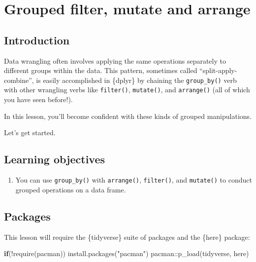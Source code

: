 \documentclass[
  letterpaper,
  DIV=11,
  numbers=noendperiod]{scrreprt}
\newenvironment{Shaded}{\begin{snugshade}}{\end{snugshade}}
\newcommand{\ControlFlowTok}[1]{\textcolor[rgb]{0.00,0.23,0.31}{\textbf{#1}}}
\newcommand{\FunctionTok}[1]{\textcolor[rgb]{0.28,0.35,0.67}{#1}}
\newcommand{\NormalTok}[1]{\textcolor[rgb]{0.00,0.23,0.31}{#1}}
\newcommand{\SpecialCharTok}[1]{\textcolor[rgb]{0.37,0.37,0.37}{#1}}
\newcommand{\StringTok}[1]{\textcolor[rgb]{0.13,0.47,0.30}{#1}}
\providecommand{\tightlist}{%
  \setlength{\itemsep}{0pt}\setlength{\parskip}{0pt}}\usepackage{longtable,booktabs,array}
\begin{document}
\chapter{Grouped filter, mutate and
arrange}\label{grouped-filter-mutate-and-arrange}

\section{Introduction}\label{introduction-11}

Data wrangling often involves applying the same operations separately to
different groups within the data. This pattern, sometimes called
``split-apply-combine'', is easily accomplished in \{dplyr\} by chaining
the \texttt{group\_by()} verb with other wrangling verbs like
\texttt{filter()}, \texttt{mutate()}, and \texttt{arrange()} (all of
which you have seen before!).

In this lesson, you'll become confident with these kinds of grouped
manipulations.

Let's get started.

\section{Learning objectives}\label{learning-objectives-11}

\begin{enumerate}
\def\labelenumi{\arabic{enumi}.}
\tightlist
\item
  You can use \texttt{group\_by()} with \texttt{arrange()},
  \texttt{filter()}, and \texttt{mutate()} to conduct grouped operations
  on a data frame.
\end{enumerate}

\section{Packages}\label{packages-6}

This lesson will require the \{tidyverse\} suite of packages and the
\{here\} package:

\begin{Shaded}
\begin{Highlighting}[]
\ControlFlowTok{if}\NormalTok{(}\SpecialCharTok{!}\FunctionTok{require}\NormalTok{(pacman)) }\FunctionTok{install.packages}\NormalTok{(}\StringTok{"pacman"}\NormalTok{)}
\NormalTok{pacman}\SpecialCharTok{::}\FunctionTok{p\_load}\NormalTok{(tidyverse, here)}
\end{Highlighting}
\end{Shaded}
\end{document}
